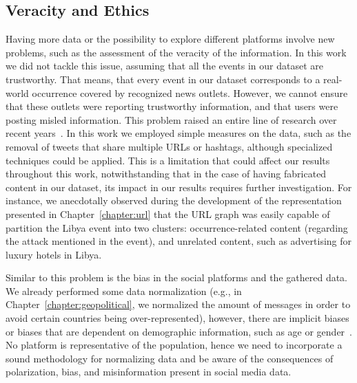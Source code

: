\subsection*{Veracity and Ethics}
%
Having more data or the possibility to explore different platforms involve new
problems, such as the assessment of the veracity of the information.
%
In this work we did not tackle this issue, assuming that all the events in our
dataset are trustworthy.
%
That means, that every event in our dataset corresponds to a real-world
occurrence covered by recognized news outlets.
%
However, we cannot ensure that these outlets were reporting trustworthy
information, and that users were posting misled information.
%
This problem raised an entire line of research over recent
years~\cite{10.1145/3137597.3137600,bovet2019influence,10.5555/2893873.2893884,10.1145/1835449.1835522,benevenuto2010detecting,10.1145/1920261.1920263}.
%
In this work we employed simple measures on the data, such as the removal of
tweets that share multiple URLs or hashtags, although specialized techniques
could be applied.
%
This is a limitation that could affect our results throughout this work,
notwithstanding that in the case of having fabricated content in our dataset,
its impact in our results requires further investigation.
%
For instance, we anecdotally observed during the development of the
representation presented in Chapter~\ref{chapter:url} that the URL graph was
easily capable of partition the Libya event into two clusters:
occurrence-related content (regarding the attack mentioned in the event), and
unrelated content, such as advertising for luxury hotels in Libya.


Similar to this problem is the bias in the social platforms and the gathered
data.
%
We already performed some data normalization (e.g., in
Chapter~\ref{chapter:geopolitical}, we normalized the amount of messages in
order to avoid certain countries being over-represented), however, there are
implicit biases or biases that are dependent on demographic information, such as
age or gender~\cite{Graells-Garrido:2019:RAD:3292522.3326057}.
%
No platform is representative of the population, hence we need to incorporate a
sound methodology for normalizing data and be aware of the consequences of
polarization, bias, and misinformation present in social media data.